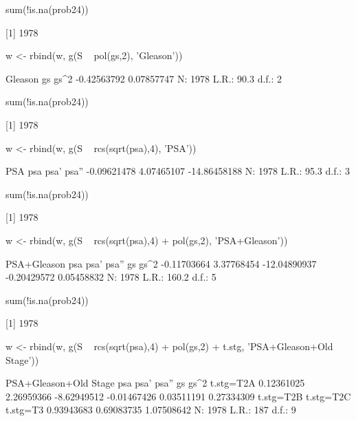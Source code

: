 \begin{Schunk}
\begin{Soutput}
sum(!is.na(prob24))

[1] 1978
\end{Soutput}
\begin{Sinput}
w <- rbind(w, g(S ~ pol(gs,2),        'Gleason'))
\end{Sinput}
\begin{Soutput}
Gleason 
         gs        gs^2 
-0.42563792  0.07857747 
N: 1978 	L.R.: 90.3 	d.f.: 2 
\end{Soutput}
\begin{Soutput}

sum(!is.na(prob24))

[1] 1978
\end{Soutput}
\begin{Sinput}
w <- rbind(w, g(S ~ rcs(sqrt(psa),4), 'PSA'))
\end{Sinput}
\begin{Soutput}
PSA 
         psa         psa'        psa'' 
 -0.09621478   4.07465107 -14.86458188 
N: 1978 	L.R.: 95.3 	d.f.: 3 
\end{Soutput}
\begin{Soutput}

sum(!is.na(prob24))

[1] 1978
\end{Soutput}
\begin{Sinput}
w <- rbind(w, g(S ~ rcs(sqrt(psa),4) + pol(gs,2), 'PSA+Gleason'))
\end{Sinput}
\begin{Soutput}
PSA+Gleason 
         psa         psa'        psa''           gs         gs^2 
 -0.11703664   3.37768454 -12.04890937  -0.20429572   0.05458832 
N: 1978 	L.R.: 160.2 	d.f.: 5 
\end{Soutput}
\begin{Soutput}

sum(!is.na(prob24))

[1] 1978
\end{Soutput}
\begin{Sinput}
w <- rbind(w, g(S ~ rcs(sqrt(psa),4) + pol(gs,2) + t.stg,
                'PSA+Gleason+Old Stage'))
\end{Sinput}
\begin{Soutput}
PSA+Gleason+Old Stage 
        psa        psa'       psa''          gs        gs^2   t.stg=T2A 
 0.12361025  2.26959366 -8.62949512 -0.01467426  0.03511191  0.27334309 
  t.stg=T2B   t.stg=T2C    t.stg=T3 
 0.93943683  0.69083735  1.07508642 
N: 1978 	L.R.: 187 	d.f.: 9 
\end{Soutput}
\begin{Soutput}


\end{Soutput}
\end{Schunk}
